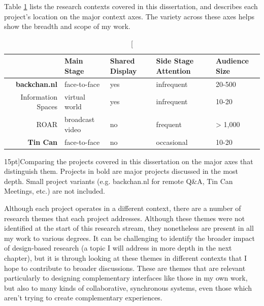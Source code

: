 Table \ref{tab:project-axes} lists the research contexts covered in this dissertation, and describes each project's location on the major context axes. The variety across these axes helps show the breadth and scope of my work. 
\begin{table}[tb]

\begin{tabular}{r|llll}
& Main Stage & Shared Display & Side Stage Attention & Audience Size \\
\hline
\textbf{backchan.nl} & face-to-face & yes & infrequent & 20-500 \\
Information Spaces & virtual world & yes & infrequent & 10-20 \\
ROAR & broadcast video & no & frequent & > 1,000 \\
\textbf{Tin Can} & face-to-face & no & occasional & 10-20 \\
\end{tabular}
\label{tab:project-axes}
\caption[][15pt]{Comparing the projects covered in this dissertation on the major axes that distinguish them. Projects in bold are major projects discussed in the most depth. Small project variants (e.g. backchan.nl for remote Q\&A, Tin Can Meetings, etc.) are not included.}
\end{table}


Although each project operates in a different context, there are a number of research themes that each project addresses. Although these themes were not identified at the start of this research stream, they nonetheless are present in all my work to various degrees. It can be challenging to identify the broader impact of design-based research (a topic I will address in more depth in the next chapter), but it is through looking at these themes in different contexts that I hope to contribute to broader discussions. These are themes that are relevant particularly to designing complementary interfaces like those in my own work, but also to many kinds of collaborative, synchronous systems, even those which aren't trying to create complementary experiences.

